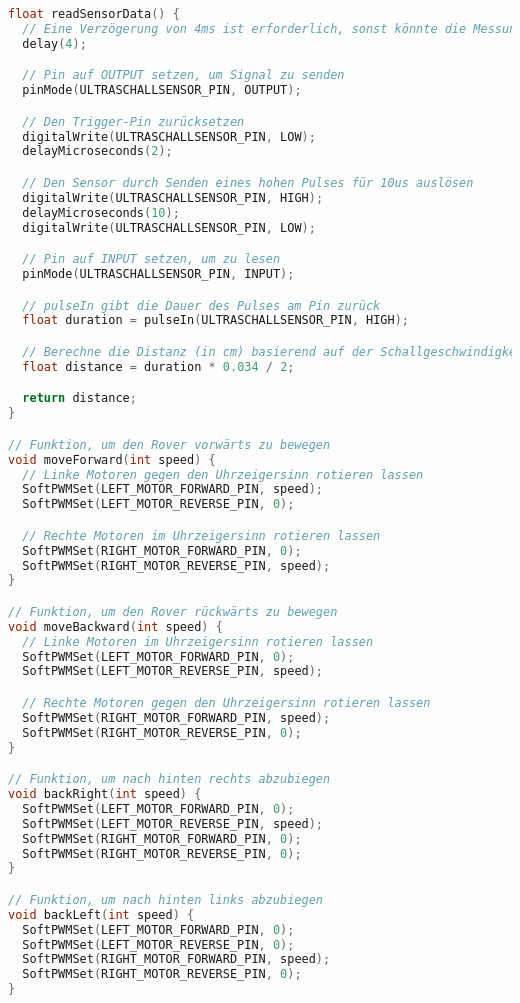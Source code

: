 \documentclass{vorlage-design-main}
\begin{document}
\begin{lstlisting}[language={C++}]
float readSensorData() {
  // Eine Verzögerung von 4ms ist erforderlich, sonst könnte die Messung 0 sein
  delay(4);

  // Pin auf OUTPUT setzen, um Signal zu senden
  pinMode(ULTRASCHALLSENSOR_PIN, OUTPUT);

  // Den Trigger-Pin zurücksetzen
  digitalWrite(ULTRASCHALLSENSOR_PIN, LOW);
  delayMicroseconds(2);

  // Den Sensor durch Senden eines hohen Pulses für 10us auslösen
  digitalWrite(ULTRASCHALLSENSOR_PIN, HIGH);
  delayMicroseconds(10);
  digitalWrite(ULTRASCHALLSENSOR_PIN, LOW);

  // Pin auf INPUT setzen, um zu lesen
  pinMode(ULTRASCHALLSENSOR_PIN, INPUT);

  // pulseIn gibt die Dauer des Pulses am Pin zurück
  float duration = pulseIn(ULTRASCHALLSENSOR_PIN, HIGH);

  // Berechne die Distanz (in cm) basierend auf der Schallgeschwindigkeit (340 m/s oder 0.034 cm/us)
  float distance = duration * 0.034 / 2;

  return distance;
}

// Funktion, um den Rover vorwärts zu bewegen
void moveForward(int speed) {
  // Linke Motoren gegen den Uhrzeigersinn rotieren lassen
  SoftPWMSet(LEFT_MOTOR_FORWARD_PIN, speed);
  SoftPWMSet(LEFT_MOTOR_REVERSE_PIN, 0);

  // Rechte Motoren im Uhrzeigersinn rotieren lassen
  SoftPWMSet(RIGHT_MOTOR_FORWARD_PIN, 0);
  SoftPWMSet(RIGHT_MOTOR_REVERSE_PIN, speed);
}

// Funktion, um den Rover rückwärts zu bewegen
void moveBackward(int speed) {
  // Linke Motoren im Uhrzeigersinn rotieren lassen
  SoftPWMSet(LEFT_MOTOR_FORWARD_PIN, 0);
  SoftPWMSet(LEFT_MOTOR_REVERSE_PIN, speed);

  // Rechte Motoren gegen den Uhrzeigersinn rotieren lassen
  SoftPWMSet(RIGHT_MOTOR_FORWARD_PIN, speed);
  SoftPWMSet(RIGHT_MOTOR_REVERSE_PIN, 0);
}

// Funktion, um nach hinten rechts abzubiegen
void backRight(int speed) {
  SoftPWMSet(LEFT_MOTOR_FORWARD_PIN, 0);
  SoftPWMSet(LEFT_MOTOR_REVERSE_PIN, speed);
  SoftPWMSet(RIGHT_MOTOR_FORWARD_PIN, 0);
  SoftPWMSet(RIGHT_MOTOR_REVERSE_PIN, 0);
}

// Funktion, um nach hinten links abzubiegen
void backLeft(int speed) {
  SoftPWMSet(LEFT_MOTOR_FORWARD_PIN, 0);
  SoftPWMSet(LEFT_MOTOR_REVERSE_PIN, 0);
  SoftPWMSet(RIGHT_MOTOR_FORWARD_PIN, speed);
  SoftPWMSet(RIGHT_MOTOR_REVERSE_PIN, 0);
}
\end{lstlisting}
\end{document}
